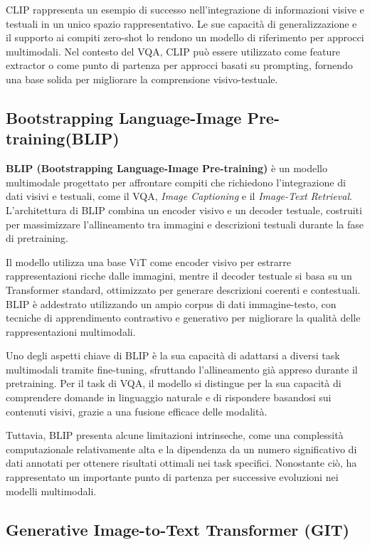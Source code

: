 \documentclass[../main.tex]{subfiles}
\begin{document}
CLIP rappresenta un esempio di successo nell'integrazione di informazioni visive e testuali in un unico spazio rappresentativo. Le sue capacità di generalizzazione e il supporto ai compiti zero-shot lo rendono un modello di riferimento per approcci multimodali. Nel contesto del VQA, CLIP può essere utilizzato come feature extractor o come punto di partenza per approcci basati su prompting, fornendo una base solida per migliorare la comprensione visivo-testuale.

\subsection{Bootstrapping Language-Image Pre-training(BLIP)}

\textbf{BLIP (Bootstrapping Language-Image Pre-training)} \cite{li2022blipbootstrappinglanguageimagepretraining} è un modello multimodale progettato per affrontare compiti che richiedono l'integrazione di dati visivi e testuali, come il VQA, \textit{Image Captioning} e il \textit{Image-Text Retrieval}. L'architettura di BLIP combina un encoder visivo e un decoder testuale, costruiti per massimizzare l'allineamento tra immagini e descrizioni testuali durante la fase di pretraining.

Il modello utilizza una base ViT come encoder visivo per estrarre rappresentazioni ricche dalle immagini, mentre il decoder testuale si basa su un Transformer standard, ottimizzato per generare descrizioni coerenti e contestuali. BLIP è addestrato utilizzando un ampio corpus di dati immagine-testo, con tecniche di apprendimento contrastivo e generativo per migliorare la qualità delle rappresentazioni multimodali.

Uno degli aspetti chiave di BLIP è la sua capacità di adattarsi a diversi task multimodali tramite fine-tuning, sfruttando l'allineamento già appreso durante il pretraining. Per il task di VQA, il modello si distingue per la sua capacità di comprendere domande in linguaggio naturale e di rispondere basandosi sui contenuti visivi, grazie a una fusione efficace delle modalità.

Tuttavia, BLIP presenta alcune limitazioni intrinseche, come una complessità computazionale relativamente alta e la dipendenza da un numero significativo di dati annotati per ottenere risultati ottimali nei task specifici. Nonostante ciò, ha rappresentato un importante punto di partenza per successive evoluzioni nei modelli multimodali.

\subsection{Generative Image-to-Text Transformer (GIT)}
\end{document}
